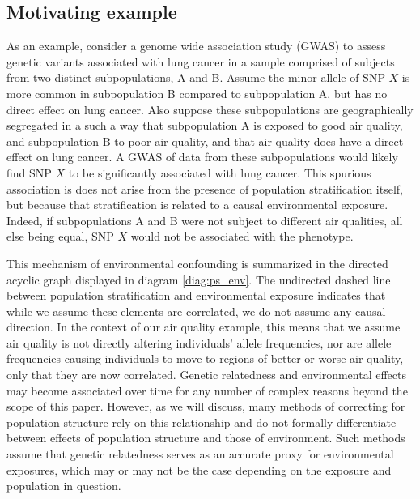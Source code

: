 \subsection{Motivating example} \label{sec:example}

As an example, consider a genome wide association study (GWAS) to assess genetic variants associated with lung cancer in a sample comprised of subjects from two distinct subpopulations, A and B. Assume the minor allele of SNP $X$ is more common in subpopulation B compared to subpopulation A, but has no direct effect on lung cancer. Also suppose these subpopulations are geographically segregated in a such a way that subpopulation A is exposed to good air quality, and subpopulation B to poor air quality, and that air quality does have a direct effect on lung cancer. A GWAS of data from these subpopulations would likely find SNP $X$ to be significantly associated with lung cancer. This spurious association is does not arise from the presence of population stratification itself, but because that stratification is related to a causal environmental exposure. Indeed, if subpopulations A and B were not subject to different air qualities, all else being equal, SNP $X$ would not be associated with the phenotype.

This mechanism of environmental confounding is summarized in the directed acyclic graph displayed in diagram \eqref{diag:ps_env}. The undirected dashed line between population stratification and environmental exposure indicates that while we assume these elements are correlated, we do not assume any causal direction.
In the context of our air quality example, this means that we assume air quality is not directly altering individuals' allele frequencies, nor are allele frequencies causing individuals to move to regions of better or worse air quality, only that they are now correlated. Genetic relatedness and environmental effects may become associated over time for any number of complex reasons beyond the scope of this paper. However, as we will discuss, many methods of correcting for population structure rely on this relationship and do not formally differentiate between effects of population structure and those of environment. Such methods assume that genetic relatedness serves as an accurate proxy for environmental exposures, which may or may not be the case depending on the exposure and population in question.

